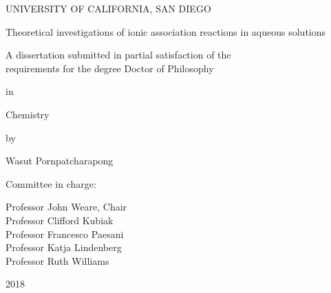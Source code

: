 \frontmatter

\titleformat{\chapter}[block]{\centering}{}{1em}{\MakeUppercase}
\titlespacing*{\chapter}{0pt}{0pt}{1em}

\pagestyle{fancy}
\fancyhf{}
\renewcommand{\headrulewidth}{0pt}
\fancyfoot[CE,CO]{\thepage}



\begin{titlepage}\begin{center}
    UNIVERSITY OF CALIFORNIA, SAN DIEGO

    \vspace{1cm}

    {Theoretical investigations of ionic association reactions in aqueous solutions}

    \vspace{1cm}

    {A dissertation submitted in partial satisfaction of the \\
    requirements for the degree Doctor of Philosophy}

    \vspace{1.3cm}

    in

    \vspace{0.7cm}

    Chemistry

    \vspace{1.3cm}

    by

    \vspace{0.7cm}

    Wasut Pornpatcharapong
\end{center}

\vspace{1.3cm}

\noindent Committee in charge:

\noindent\hspace{0.5in} Professor John Weare, Chair \\
\noindent\hspace*{0.5in} Professor Clifford Kubiak \\
\noindent\hspace*{0.5in} Professor Francesco Paesani \\
\noindent\hspace*{0.5in} Professor Katja Lindenberg \\
\noindent\hspace*{0.5in} Professor Ruth Williams

\vspace{0.7cm}

\begin{center}
    2018
\end{center}\end{titlepage}

